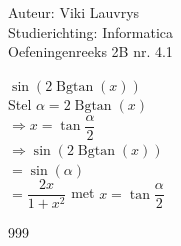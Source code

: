 \documentclass[a4paper]{article}
\begin{document}
  
\noindent \large Auteur: Viki Lauvrys        \\
\noindent \large Studierichting: Informatica \\
\noindent \large Oefeningenreeks 2B nr. 4.1 \\

\medskip

\normalsize

$ \sin \left( 2 \operatorname{Bgtan}(x) \right) $ \\

Stel $ \alpha = 2 \operatorname{Bgtan}(x) $ \\

$ \Rightarrow x = \tan \dfrac{\alpha}{2} $ \\

$ \Rightarrow \sin\left(2 \operatorname{Bgtan}(x)\right) $ \\

$ = \sin(\alpha) $ \\

$ = \dfrac{2x}{1 + x^2} $ met $ x = \tan \dfrac{\alpha}{2} $ \\

\begin{thebibliography}{999}
\end{thebibliography}
\end{document}

